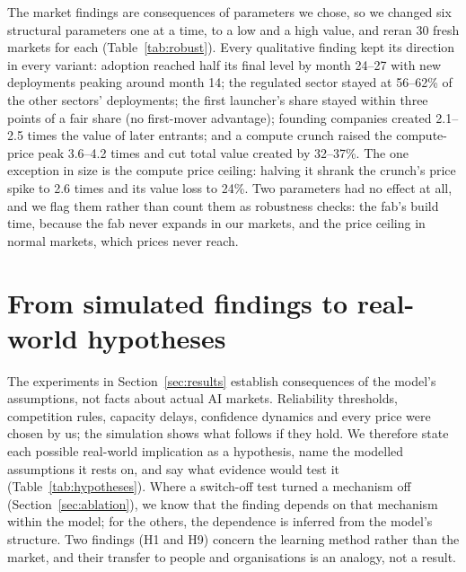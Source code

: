 \documentclass[11pt]{article}
\begin{document}
The market findings are consequences of parameters we chose, so we changed six structural parameters one at a time, to a low and a high value, and reran 30 fresh markets for each (Table~\ref{tab:robust}). Every qualitative finding kept its direction in every variant: adoption reached half its final level by month 24--27 with new deployments peaking around month 14; the regulated sector stayed at 56--62\% of the other sectors' deployments; the first launcher's share stayed within three points of a fair share (no first-mover advantage); founding companies created 2.1--2.5 times the value of later entrants; and a compute crunch raised the compute-price peak 3.6--4.2 times and cut total value created by 32--37\%. The one exception in size is the compute price ceiling: halving it shrank the crunch's price spike to 2.6 times and its value loss to 24\%. Two parameters had no effect at all, and we flag them rather than count them as robustness checks: the fab's build time, because the fab never expands in our markets, and the price ceiling in normal markets, which prices never reach.

\section{From simulated findings to real-world hypotheses}
\label{sec:lessons}

The experiments in Section~\ref{sec:results} establish consequences of the model's assumptions, not facts about actual AI markets. Reliability thresholds, competition rules, capacity delays, confidence dynamics and every price were chosen by us; the simulation shows what follows if they hold. We therefore state each possible real-world implication as a hypothesis, name the modelled assumptions it rests on, and say what evidence would test it (Table~\ref{tab:hypotheses}). Where a switch-off test turned a mechanism off (Section~\ref{sec:ablation}), we know that the finding depends on that mechanism within the model; for the others, the dependence is inferred from the model's structure. Two findings (H1 and H9) concern the learning method rather than the market, and their transfer to people and organisations is an analogy, not a result.
\end{document}
